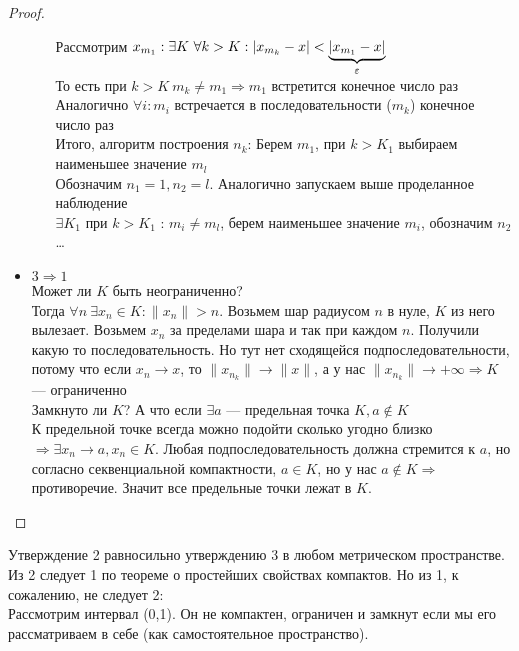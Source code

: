 \begin{proof}
\begin{itemize}
\begin{enumerate}
				Рассмотрим $x_{m_1}: \exists K \ \forall k > K : \left| x_{m_k} - x \right| < \underbrace{\left| x_{m_1} - x \right|}_{\varepsilon}$ \\
				То есть при $k > K \ m_k \neq m_1 \Rightarrow m_1$ встретится конечное число раз
				Аналогично  $\forall i: m_i$ встречается в последовательности ($m_k$) конечное число раз \\
				Итого, алгоритм построения $n_k$:
				Берем $m_1$, при $k > K_1$ выбираем наименьшее значение $m_l$ \\
				Обозначим $n_1 = 1, n_2 = l$. Аналогично запускаем выше проделанное наблюдение \\
				$\exists K_1$ при $k > K_1$ : $m_i \neq m_l$, берем наименьшее значение $m_i$, обозначим $n_2$ 
				\ldots
			\end{enumerate}
			
			\item $3 \Rightarrow 1$ \\
			Может ли $K$ быть неограниченно? \\
			Тогда $\forall n \ \exists x_n \in K: \|x_n\| > n $. Возьмем шар радиусом $n$ в нуле, $K$ из него вылезает. Возьмем $x_n$ за пределами шара и так при каждом $n$.  Получили какую то последовательность. Но тут нет сходящейся подпоследовательности, потому что если $x_n \to x$, то $\|x_{n_k}\| \to \|x\|$, а у нас $\|x_{n_k}\| \to + \infty  \Rightarrow K$ --- ограниченно \\
			Замкнуто ли $K$? А что если $\exists a$ --- предельная точка $K, a \not \in K$ \\
			К предельной точке всегда можно подойти сколько угодно близко $\Rightarrow \exists x_n \to a, x_n \in K$. Любая подпоследовательность должна стремится к $a$, но согласно секвенциальной компактности, $a \in K$, но у нас $a \not \in K \Rightarrow$ противоречие. Значит все предельные точки лежат в $K$. 
		\end{itemize}
	\end{proof}
	
	\begin{remark}
		Утверждение 2 равносильно утверждению 3 в любом метрическом пространстве. Из 2 следует 1 по теореме о простейших свойствах компактов. Но из 1, к сожалению,  не следует 2: \\
		Рассмотрим интервал (0,1). Он не компактен,  ограничен и замкнут если мы его рассматриваем в себе (как самостоятельное пространство). 
	\end{remark}
